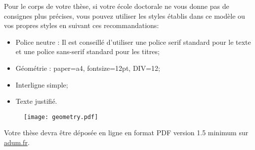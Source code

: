 Pour le corps de votre thèse, si votre école doctorale ne vous donne pas de consignes plus précises, vous pouvez utiliser les styles établis dans ce modèle ou vos propres styles en suivant ces recommandations:
\begin{itemize}
	\item Police neutre : Il est conseillé d'utiliser une police serif standard pour le texte et une police sans-serif standard pour les titres;
	\item Géométrie : paper=a4, fontsize=12pt, DIV=12;
	\item Interligne simple;
	\item Texte justifié.
\end{itemize}

\begin{figure}[h!tbp]
	\centering
	\texttt{[image: geometry.pdf]}
\end{figure}


Votre thèse devra être déposée en ligne en format PDF version 1.5 minimum sur \href{https://www.adum.fr/}{adum.fr}.



